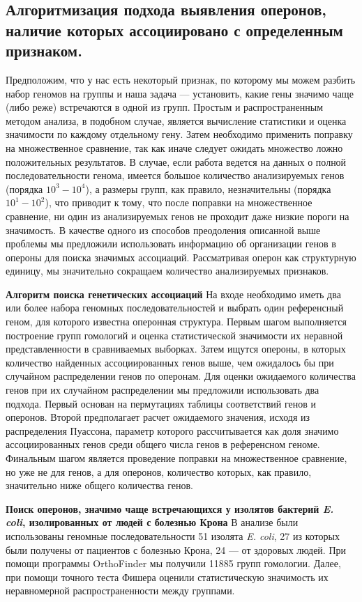 \subsection*{Алгоритмизация подхода выявления оперонов, наличие которых ассоциировано с определенным признаком. } \label{chaptOperons}

Предположим, что у нас есть некоторый признак, по которому мы можем разбить набор геномов на группы и наша задача --- установить, какие гены значимо чаще (либо реже) встречаются в одной из групп. Простым и распространенным методом анализа, в подобном случае, является вычисление статистики и оценка значимости по каждому отдельному гену. Затем необходимо применить поправку на множественное сравнение, так как иначе следует ожидать множество ложно положительных результатов. В случае, если работа ведется на данных о полной последовательности генома, имеется большое количество анализируемых генов (порядка $10^3 - 10^4$), а размеры групп, как правило, незначительны (порядка $10^1 - 10^2$), что приводит к тому, что после поправки на множественное сравнение, ни один из анализируемых генов не проходит даже низкие пороги на значимость. В качестве одного из способов преодоления описанной выше проблемы мы предложили использовать информацию об организации генов в опероны для поиска значимых ассоциаций. Рассматривая оперон как структурную единицу, мы значительно сокращаем количество анализируемых признаков.

\textbf{Алгоритм поиска генетических ассоциаций}
На входе необходимо иметь два или более набора геномных последовательностей и выбрать один референсный геном, для которого известна оперонная структура. Первым шагом выполняется построение групп гомологий и оценка статистической значимости их неравной представленности в сравниваемых выборках. Затем ищутся опероны, в которых количество найденных ассоциированных генов выше, чем ожидалось бы при случайном распределении генов по оперонам. Для оценки ожидаемого количества генов при их случайном распределении мы предложили использовать два подхода. Первый основан на пермутациях таблицы соответствий генов и оперонов. Второй предполагает расчет ожидаемого значения, исходя из распределения Пуассона, параметр которого рассчитывается как доля значимо ассоциированных генов среди общего числа генов в референсном геноме. Финальным шагом является проведение поправки на множественное сравнение, но уже не для генов, а для оперонов, количество которых, как правило, значительно ниже общего количества генов. 

\textbf{Поиск оперонов, значимо чаще встречающихся у изолятов бактерий \textit{E. coli}, изолированных от людей с болезнью Крона}
В анализе были использованы геномные последовательности 51 изолята \textit{E. coli}, 27 из которых были получены от пациентов с болезнью Крона, 24 --- от здоровых людей. При помощи программы OrthoFinder мы получили 11885 групп гомологии. Далее, при помощи точного теста Фишера оценили статистическую значимость их неравномерной распространенности между группами.  

